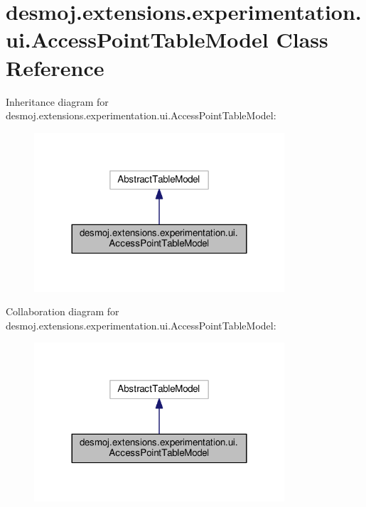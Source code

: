 \section{desmoj.\-extensions.\-experimentation.\-ui.\-Access\-Point\-Table\-Model Class Reference}
\label{classdesmoj_1_1extensions_1_1experimentation_1_1ui_1_1_access_point_table_model}


Inheritance diagram for desmoj.\-extensions.\-experimentation.\-ui.\-Access\-Point\-Table\-Model\-:
\nopagebreak
\begin{figure}[H]
\begin{center}
\leavevmode
\includegraphics[width=264pt]{classdesmoj_1_1extensions_1_1experimentation_1_1ui_1_1_access_point_table_model__inherit__graph}
\end{center}
\end{figure}


Collaboration diagram for desmoj.\-extensions.\-experimentation.\-ui.\-Access\-Point\-Table\-Model\-:
\nopagebreak
\begin{figure}[H]
\begin{center}
\leavevmode
\includegraphics[width=264pt]{classdesmoj_1_1extensions_1_1experimentation_1_1ui_1_1_access_point_table_model__coll__graph}
\end{center}
\end{figure}
